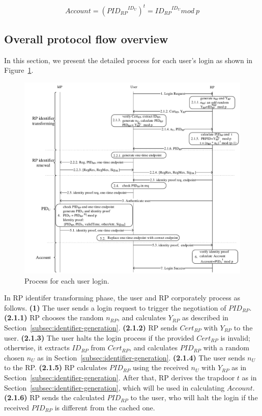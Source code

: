  \begin{equation}
   Account = ({PID_{RP}}^{ID_U})^t = {ID_{RP}}^{ID_U} mod \ p
   \label{equ:account}
   \end{equation}


\subsection{Overall protocol flow overview}
\label{sebsec:loginprocess}
In this section, we present the detailed process for each user's login as shown in Figure~\ref{fig:process}. %

\begin{figure}
  \centering
  \includegraphics[width=0.85\linewidth]{fig/process.pdf}
  \caption{Process for each user login.}
  \label{fig:process}
\end{figure}

In RP identifer transforming phase, the user and RP corporately process as follows. \textbf{(1)} The user sends a login request to trigger the negotiation of $PID_{RP}$. \textbf{(2.1.1)} RP chooses the random $n_{RP}$, and calculates $Y_{RP}$ as described in Section~\ref{subsec:identifier-generation}. \textbf{(2.1.2)} RP sends $Cert_{RP}$ with $Y_{RP}$ to the user.  \textbf{(2.1.3)} The user halts the login process if the provided $Cert_{RP}$ is invalid; otherwise, it extracts $ID_{RP}$ from $Cert_{RP}$, and calculates $PID_{RP}$ with a random chosen $n_U$ as in Section~\ref{subsec:identifier-generation}. \textbf{(2.1.4)} The user sends $n_U$ to the RP. \textbf{(2.1.5)} RP calculates $PID_{RP}$ using the received $n_U$ with $Y_{RP}$ as in Section~\ref{subsec:identifier-generation}. After that, RP derives the trapdoor $t$ as in Section~\ref{subsec:identifier-generation}, which will be used in calculating $Account$. \textbf{(2.1.6)} RP sends the calculated $PID_{RP}$ to the user, who will halt the login if the received $PID_{RP}$ is different from the cached one.


